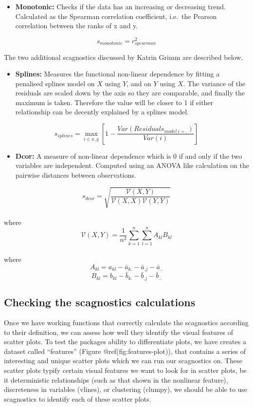 \begin{itemize}
\tightlist
\item
  \textbf{Monotonic:} Checks if the data has an increasing or decreasing
  trend. Calculated as the Spearman correlation coefficient, i.e.~the
  Pearson correlation between the ranks of x and y.
\end{itemize}

\[s_{monotonic} = r^2_{spearman}\]

The two additional scagnostics discussed by Katrin Grimm are described
below.

\begin{itemize}
\tightlist
\item
  \textbf{Splines:} Measures the functional non-linear dependence by
  fitting a penalised splines model on \(X\) using \(Y\), and on \(Y\)
  using \(X\). The variance of the residuals are scaled down by the axis
  so they are comparable, and finally the maximum is taken. Therefore
  the value will be closer to 1 if either relationship can be decently
  explained by a splines model.
\end{itemize}

\[s_{splines}=\max_{i\in x,y}[1-\frac{Var(Residuals_{model~i=.})}{Var(i)}]\]

\begin{itemize}
\tightlist
\item
  \textbf{Dcor:} A measure of non-linear dependence which is 0 if and
  only if the two variables are independent. Computed using an ANOVA
  like calculation on the pairwise distances between observations.
\end{itemize}

\[s_{dcor}= \sqrt{\frac{\mathcal{V}(X,Y)}{\mathcal{V}(X,X)\mathcal{V}(Y,Y)}}\]\\
where \[\mathcal{V}
(X,Y)=\frac{1}{n^2}\sum_{k=1}^n\sum_{l=1}^nA_{kl}B_{kl}\]\\
where \[A_{kl}=a_{kl}-\bar{a}_{k.}-\bar{a}_{.j}-\bar{a}_{..}\]
\[B_{kl}=b_{kl}-\bar{b}_{k.}-\bar{b}_{.j}-\bar{b}_{..}\]

\hypertarget{checking-the-scagnostics-calculations}{%
\subsection{Checking the scagnostics
calculations}\label{checking-the-scagnostics-calculations}}

Once we have working functions that correctly calculate the scagnostics
according to their definition, we can assess how well they identify the
visual features of scatter plots. To test the packages ability to
differentiate plots, we have creates a dataset called ``features''
(Figure @ref(fig:features-plot)), that contains a series of interesting
and unique scatter plots which we can run our scagnostics on. These
scatter plots typify certain visual features we want to look for in
scatter plots, be it deterministic relationships (such as that shown in
the nonlinear feature), discreteness in variables (vlines), or
clustering (clumpy), we should be able to use scagnostics to identify
each of these scatter plots.

